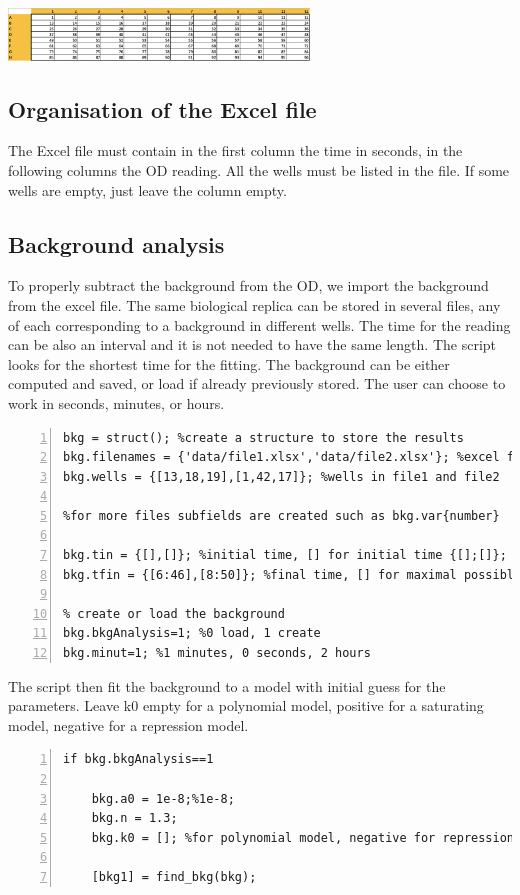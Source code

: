\documentclass{article}
\begin{document}
\begin{center}
\includegraphics[width=0.6\textwidth]{plate} 
\end{center}

\subsection{Organisation of the Excel file}
The Excel file must contain in the first column the time in seconds, in the following columns the OD reading. All the wells must be listed in the file. If some wells are empty, just leave the column empty.

\subsection{Background analysis}
To properly subtract the background from the OD, we import the background from the excel file. The same biological replica can be stored in several files, any of each corresponding to a background in different wells. The time for the reading can be also an interval and it is not needed to have the same length. The script looks for the shortest time for the fitting. The background can be either computed and saved, or load if already previously stored. The user can choose to work in seconds, minutes, or hours.
\begin{lstlisting}[frame=single,numbers=left,style=Matlab-Pyglike]
bkg = struct(); %create a structure to store the results
bkg.filenames = {'data/file1.xlsx','data/file2.xlsx'}; %excel files
bkg.wells = {[13,18,19],[1,42,17]}; %wells in file1 and file2

%for more files subfields are created such as bkg.var{number}

bkg.tin = {[],[]}; %initial time, [] for initial time {[];[]};
bkg.tfin = {[6:46],[8:50]}; %final time, [] for maximal possible final time {[];[]};

% create or load the background
bkg.bkgAnalysis=1; %0 load, 1 create
bkg.minut=1; %1 minutes, 0 seconds, 2 hours
\end{lstlisting}
The script then fit the background to a model with initial guess for the parameters. Leave k0 empty for a polynomial model, positive for a saturating model, negative for a repression model.
\begin{lstlisting}[frame=single,numbers=left,style=Matlab-Pyglike]
if bkg.bkgAnalysis==1

    bkg.a0 = 1e-8;%1e-8;
    bkg.n = 1.3;
    bkg.k0 = []; %for polynomial model, negative for repression model

    [bkg1] = find_bkg(bkg);
\end{lstlisting}
\end{document}
